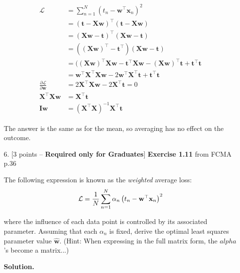 \documentclass[10pt]{article}
\begin{document}
\begin{itemize}
\begin{eqnarray*}
\begin{aligned}
\mathcal{L} &= \sum_{n=1}^N \left( t_n - \mathbf{w}^\top \mathbf{x}_n \right)^2
\\
&= (\mathbf{t} - \mathbf{X} \mathbf{w})^\top (\mathbf{t} - \mathbf{X} \mathbf{w})
\\
&= (\mathbf{X} \mathbf{w} - \mathbf{t})^\top (\mathbf{X} \mathbf{w} - \mathbf{t})
\\
&= ((\mathbf{X} \mathbf{w})^\top - \mathbf{t}^\top) (\mathbf{X} \mathbf{w} - \mathbf{t})
\\
&= ((\mathbf{X} \mathbf{w})^\top \mathbf{X} \mathbf{w} 
 - \mathbf{t}^\top \mathbf{X} \mathbf{w} 
 - (\mathbf{X} \mathbf{w})^\top \mathbf{t}
 + \mathbf{t}^\top \mathbf{t}
\\
&= \mathbf{w}^\top \mathbf{X}^\top \mathbf{X} \mathbf{w} 
 - 2 \mathbf{w}^\top \mathbf{X}^\top \mathbf{t} 
 + \mathbf{t}^\top \mathbf{t}
\\
\frac { \partial \mathcal{L}} {\partial \mathbf{w}} &=
 2 \mathbf{X}^\top \mathbf{X} \mathbf{w} - 2 \mathbf{X}^\top \mathbf{t} = 0
\\
\mathbf{X}^\top \mathbf{X} \mathbf{w} &= \mathbf{X}^\top \mathbf{t}
\\
\mathbf{I} \mathbf{w} &= (\mathbf{X}^\top \mathbf{X})^{-1} \mathbf{X}^\top \mathbf{t}
\end{aligned}
\end{eqnarray*}

The answer is the same as for the mean, so averaging has no effect on the outcome.

\item[6.] [3 points -- {\bf Required only for Graduates}]
{\bf Exercise 1.11} from FCMA p.36

The following expression is known as the {\em weighted} average loss:
\begin{eqnarray*}
\mathcal{L} = {1 \over N} \sum_{n=1}^N \alpha_n \left( t_n - \mathbf{w}^\top \mathbf{x}_n \right)^2
\end{eqnarray*}

where the influence of each data point is controlled by its associated parameter.  Assuming that each $\alpha_n$ is fixed, derive the optimal least squares parameter value $\mathbf{\hat{w}}$.  (Hint: When expressing in the full matrix form, the $alpha$'s become a matrix...)

{\bf Solution.} 


\end{itemize}
\end{document}
